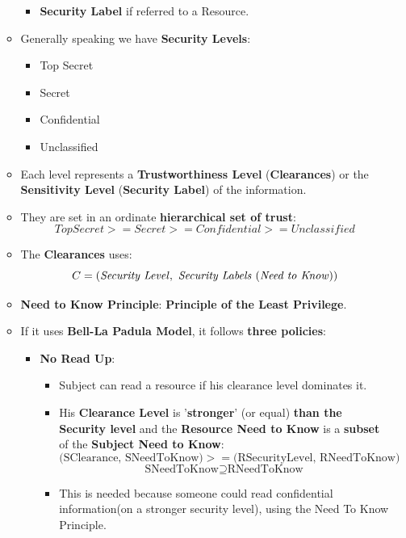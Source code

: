 \documentclass[9pt, letterpaper]{article}
\begin{document}
\begin{itemize}
\begin{itemize}
\begin{itemize}
			            \item \textbf{Security Label} if referred to a Resource.
		            \end{itemize}
		      \item Generally speaking we have \textbf{Security Levels}:
		            \begin{itemize}
			            \item Top Secret
			            \item Secret
			            \item Confidential
			            \item Unclassified
		            \end{itemize}
		      \item Each level represents a \textbf{Trustworthiness Level} (\textbf{Clearances}) or the \textbf{Sensitivity Level} (\textbf{Security Label}) of the information.
		      \item They are set in an ordinate \textbf{hierarchical set of trust}: $$ Top Secret >= Secret >= Confidential >= Unclassified $$
		      \item The \textbf{Clearances} uses: $$C = ( \mbox{\textit{Security Level}}, \mbox{ \textit{Security Labels} (\textit{Need to Know})})$$
		      \item \textbf{Need to Know Principle}: \textbf{Principle of the Least Privilege}.
		      \item If it uses \textbf{Bell-La Padula Model}, it follows \textbf{three policies}:
		            \begin{itemize}
			            \item \textbf{No Read Up}:
			                  \begin{itemize}
				                  \item Subject can read a resource if his clearance level dominates it.
				                  \item His \textbf{Clearance Level} is '\textbf{stronger}' (or equal) \textbf{than the Security level} and the \textbf{Resource Need to Know} is a \textbf{subset} of the \textbf{Subject Need to Know}:
				                        $$(\mbox{SClearance, SNeedToKnow)}>=(\mbox{RSecurityLevel, RNeedToKnow)}$$
				                        $$\mbox{SNeedToKnow} \supseteq \mbox{RNeedToKnow}$$
				                  \item This is needed because someone could read confidential information(on a stronger security level), using the Need To Know Principle.
			                  \end{itemize}

\end{itemize}
\end{itemize}
\end{itemize}
\end{document}
